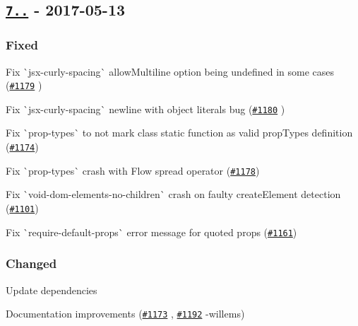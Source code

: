 \subsection*{\href{https://github.com/yannickcr/eslint-plugin-react/compare/v7.0.0...v7.0.1}{\tt 7..} -\/ 2017-\/05-\/13}

\subsubsection*{Fixed}


\begin{DoxyItemize}
\item Fix \`{}jsx-\/curly-\/spacing\`{} {\ttfamily allow\+Multiline} option being undefined in some cases (\href{https://github.com/yannickcr/eslint-plugin-react/pull/1179}{\tt \#1179} )
\item Fix \`{}jsx-\/curly-\/spacing\`{} newline with object literals bug (\href{https://github.com/yannickcr/eslint-plugin-react/pull/1180}{\tt \#1180} )
\item Fix \`{}prop-\/types\`{} to not mark class static function as valid prop\+Types definition (\href{https://github.com/yannickcr/eslint-plugin-react/issues/1174}{\tt \#1174})
\item Fix \`{}prop-\/types\`{} crash with Flow spread operator (\href{https://github.com/yannickcr/eslint-plugin-react/issues/1178}{\tt \#1178})
\item Fix \`{}void-\/dom-\/elements-\/no-\/children\`{} crash on faulty {\ttfamily create\+Element} detection (\href{https://github.com/yannickcr/eslint-plugin-react/issues/1101}{\tt \#1101})
\item Fix \`{}require-\/default-\/props\`{} error message for quoted props (\href{https://github.com/yannickcr/eslint-plugin-react/issues/1161}{\tt \#1161})
\end{DoxyItemize}

\subsubsection*{Changed}


\begin{DoxyItemize}
\item Update dependencies
\item Documentation improvements (\href{https://github.com/yannickcr/eslint-plugin-react/pull/1173}{\tt \#1173} , \href{https://github.com/yannickcr/eslint-plugin-react/pull/1192}{\tt \#1192} -\/willems)
\end{DoxyItemize}

